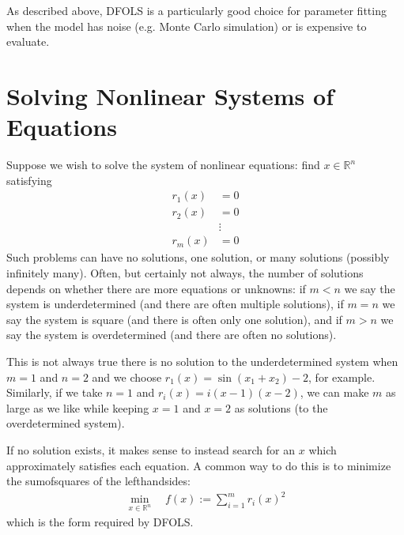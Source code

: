 \documentclass[letterpaper,10pt,english]{sphinxmanual}
\begin{document}
\sphinxAtStartPar
As described above, DFO\sphinxhyphen{}LS is a particularly good choice for parameter fitting when the model has noise (e.g. Monte Carlo simulation) or is expensive to evaluate.


\section{Solving Nonlinear Systems of Equations}
\label{\detokenize{info:solving-nonlinear-systems-of-equations}}
\sphinxAtStartPar
Suppose we wish to solve the system of nonlinear equations: find \(x\in\mathbb{R}^n\) satisfying
\begin{equation*}
\begin{split}r_1(x) &= 0 \\
r_2(x) &= 0 \\
&\vdots \\
r_m(x) &= 0\end{split}
\end{equation*}
\sphinxAtStartPar
Such problems can have no solutions, one solution, or many solutions (possibly infinitely many). Often, but certainly not always, the number of solutions depends on whether there are more equations or unknowns: if \(m<n\) we say the system is underdetermined (and there are often multiple solutions), if \(m=n\) we say the system is square (and there is often only one solution), and if \(m>n\) we say the system is overdetermined (and there are often no solutions).

\sphinxAtStartPar
This is not always true \textendash{} there is no solution to the underdetermined system when \(m=1\) and \(n=2\) and we choose \(r_1(x)=\sin(x_1+x_2)-2\), for example.
Similarly, if we take \(n=1\) and \(r_i(x)=i (x-1)(x-2)\), we can make \(m\) as large as we like while keeping \(x=1\) and \(x=2\) as solutions (to the overdetermined system).

\sphinxAtStartPar
If no solution exists, it makes sense to instead search for an \(x\) which approximately satisfies each equation. A common way to do this is to minimize the sum\sphinxhyphen{}of\sphinxhyphen{}squares of the left\sphinxhyphen{}hand\sphinxhyphen{}sides:
\begin{equation*}
\begin{split}\min_{x\in\mathbb{R}^n}  \quad  f(x) := \sum_{i=1}^{m}r_i(x)^2\end{split}
\end{equation*}
\sphinxAtStartPar
which is the form required by DFO\sphinxhyphen{}LS.
\end{document}
